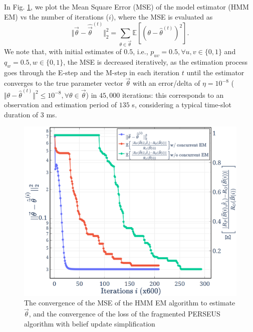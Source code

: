 \documentclass[10pt, twocolumn]{IEEEtran}
\begin{document}
In Fig. \ref{Fig. 7}, we plot the Mean Square Error (MSE) of the model estimator (HMM EM) vs the number of iterations ($i$), where the MSE is evaluated as
\begin{equation}\label{32}
    \Vert\vec{\theta}-\hat{\vec{\theta}}^{(t)}\Vert_{2}^{2}=\sum_{\theta{\in}\vec{\theta}}\mathbb{E}[(\theta-\hat{\theta}^{(t)})^{2}].
\end{equation}
We note that, with initial estimates of $0.5$, i.e., $p_{uv}{=}0.5,{\forall}u,v{\in}\{0,1\}$ and $q_{w}{=}0.5,w{\in}\{0,1\}$, the MSE is decreased iteratively, as the estimation process goes through the E-step and the M-step in each iteration $t$ until the estimator converges \cite{Rabiner_1989} to the true parameter vector $\vec{\theta}$ with an error/delta of $\eta{=}10^{-8}$ ($\Vert\theta{-}\hat{\theta}^{(t)}\Vert^{2}{\leq}10^{-8},{\forall}\theta{\in}\vec{\theta}$) in $45,000$ iterations: this corresponds to an observation and estimation period of $135$ s, considering a typical time-slot duration of $3$ ms.
\begin{figure} [t]
    \centerline{
    \includegraphics[width=0.8\linewidth]{figures/Minerva_HMM_EM_and_PERSEUS_plot.png}}
    \vspace{-2mm}
    \caption{The convergence of the MSE of the HMM EM algorithm to estimate $\vec{\theta}$, and the convergence of the loss of the fragmented PERSEUS algorithm with belief update simplification}
    \vspace{-5mm}
    \label{Fig. 7}
\end{figure}
\end{document}
